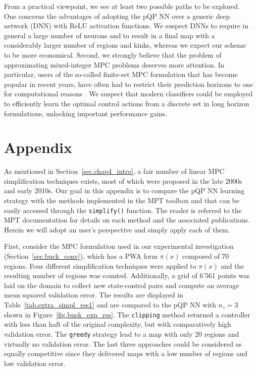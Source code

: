 From a practical viewpoint, we see at least two possible paths to be explored. One concerns the advantages of adopting the pQP NN over a generic deep network (DNN) with ReLU activation functions. We suspect DNNs to require in general a large number of neurons and to result in a final map with a considerably larger number of regions and kinks, whereas we expect our scheme to be more economical. Second, we strongly believe that the problem of approximating mixed-integer MPC problems deserves more attention. In particular, users of the so-called finite-set MPC formulation \citep{karamanakos2019guidelines} that has become popular in recent years, have often had to restrict their prediction horizons to one for computational reasons \citep{kim2015offset}. We suspect that modern classifiers could be employed to efficiently learn the optimal control actions from a discrete set in long horizon formulations, unlocking important performance gains.


\pagebreak

\section{Appendix}

As mentioned in Section~\ref{sec.chap4_intro}, a fair number of linear MPC simplification techniques exists, most of which were proposed in the late 2000s and early 2010s. Our goal in this appendix is to compare the pQP NN learning strategy with the methods implemented in the MPT toolbox \citep{herceg2013multi} and that can be easily accessed through the \texttt{simplify()} function. The reader is referred to the MPT documentation for details on each method and the associated publications. Herein we will adopt an user's perspective and simply apply each of them.

First, consider the MPC formulation used in our experimental investigation (Section~\ref{sec.buck_conv}), which has a PWA form $\pi(x)$ composed of $70$ regions. Four different simplification techniques were applied to $\pi(x)$ and the resulting number of regions was counted. Additionally, a grid of 6'561 points was laid on the domain to collect new state-control pairs and compute an average mean squared validation error. The results are displayed in Table~\ref{tab.extra_simpl_res1} and are compared to the pQP NN with $n_z=3$ shown in Figure~\ref{fig.buck_exp_res}. The \texttt{clipping} method returned a controller with less than haft of the original complexity, but with comparatively high validation error. The \texttt{greedy} strategy lead to a map with only $20$ regions and virtually no validation error. The last three approaches could be considered as equally competitive since they delivered maps with a low number of regions and low validation error.

